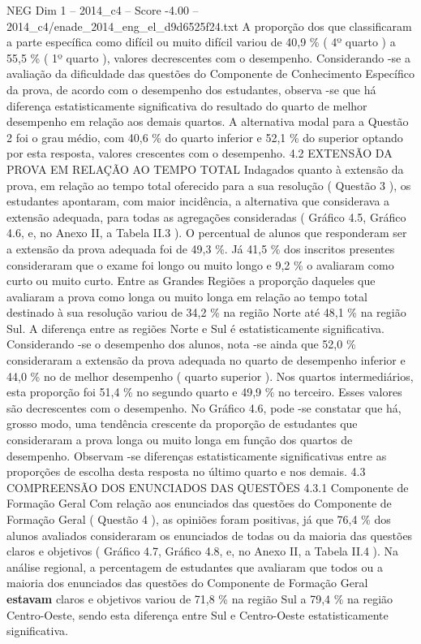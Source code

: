 \begin{textsample}{NEG Dim 1 – 2014\_c4 – Score -4.00 – 2014\_c4/enade\_2014\_eng\_el\_d9d6525f24.txt}
A proporção dos que classificaram a parte específica como difícil ou muito difícil variou de 40,9 \% ( 4º quarto ) a 55,5 \% ( 1º quarto ), valores decrescentes com o desempenho.
Considerando -se a avaliação da dificuldade das questões do Componente de Conhecimento Específico da prova, de acordo com o desempenho dos estudantes, observa -se que há diferença estatisticamente significativa do resultado do quarto de melhor desempenho em relação aos demais quartos.
A alternativa modal para a Questão 2 foi o grau médio, com 40,6 \% do quarto inferior e 52,1 \% do superior optando por esta resposta, valores crescentes com o desempenho. 4.2 EXTENSÃO DA PROVA EM RELAÇÃO AO TEMPO TOTAL Indagados quanto à extensão da prova, em relação ao tempo total oferecido para a sua resolução ( Questão 3 ), os estudantes apontaram, com maior incidência, a alternativa que considerava a extensão adequada, para todas as agregações consideradas ( Gráfico 4.5, Gráfico 4.6, e, no Anexo II, a Tabela II.3 ).
O percentual de alunos que responderam ser a extensão da prova adequada foi de 49,3 \%.
Já 41,5 \% dos inscritos presentes consideraram que o exame foi longo ou muito longo e 9,2 \% o avaliaram como curto ou muito curto.
Entre as Grandes Regiões a proporção daqueles que avaliaram a prova como longa ou muito longa em relação ao tempo total destinado à sua resolução variou de 34,2 \% na região Norte até 48,1 \% na região Sul.
A diferença entre as regiões Norte e Sul é estatisticamente significativa.
Considerando -se o desempenho dos alunos, nota -se ainda que 52,0 \% consideraram a extensão da prova adequada no quarto de desempenho inferior e 44,0 \% no de melhor desempenho ( quarto superior ).
Nos quartos intermediários, esta proporção foi 51,4 \% no segundo quarto e 49,9 \% no terceiro.
Esses valores são decrescentes com o desempenho.
No Gráfico 4.6, pode -se constatar que há, grosso modo, uma tendência crescente da proporção de estudantes que consideraram a prova longa ou muito longa em função dos quartos de desempenho.
Observam -se diferenças estatisticamente significativas entre as proporções de escolha desta resposta no último quarto e nos demais. 4.3 COMPREENSÃO DOS ENUNCIADOS DAS QUESTÕES 4.3.1 Componente de Formação Geral Com relação aos enunciados das questões do Componente de Formação Geral ( Questão 4 ), as opiniões foram positivas, já que 76,4 \% dos alunos avaliados consideraram os enunciados de todas ou da maioria das questões claros e objetivos ( Gráfico 4.7, Gráfico 4.8, e, no Anexo II, a Tabela II.4 ).
Na análise regional, a percentagem de estudantes que avaliaram que todos ou a maioria dos enunciados das questões do Componente de Formação Geral \textbf{estavam} claros e objetivos variou de 71,8 \% na região Sul a 79,4 \% na região Centro-Oeste, sendo esta diferença entre Sul e Centro-Oeste estatisticamente significativa.

\end{textsample}
